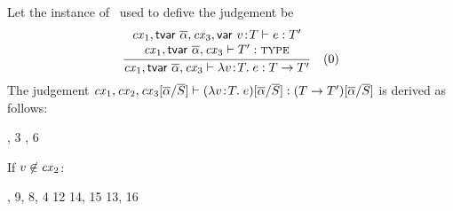 \begin{bycase}
\Case{\Reabs}\\
Let the instance of \Reabs\ used to defive the judgement be
\[
\frac{\begin{array}{c}\mathit{cx}_1,\mathsf{tvar}\ \overline{\alpha},\mathit{cx}_3,\mathsf{var}\ v\!:\!T\vdash e:T'\\\mathit{cx}_1,\mathsf{tvar}\ \overline{\alpha},\mathit{cx}_3\vdash T':\textsc{type}\end{array}}{\mathit{cx}_1,\mathsf{tvar}\ \overline{\alpha},\mathit{cx}_3\vdash\lambda v\!:\!T.\;e:T\to T'}\quad\mbox{(0)}
\]
The judgement
$\mathit{cx}_1,\mathit{cx}_2,\mathit{cx}_3[\overline{\alpha}/\overline{S}]\vdash(\lambda v\!:\!T.\;e)[\overline{\alpha}/\overline{S}]:(T\to T')[\overline{\alpha}/\overline{S}]$
is derived as follows:
\begin{derivation}
     {\indhyp, 3}
     {\indhyp, 6}
\end{derivation}
If $v\not\in\mathit{cx}_2$:
\begin{derivatioN}{7}
     {\Rcxvdec, 9, 8, 4}
     {12}
     {}
     {14, 15}
     {13, 16}

\end{derivatioN}
\end{bycase}
